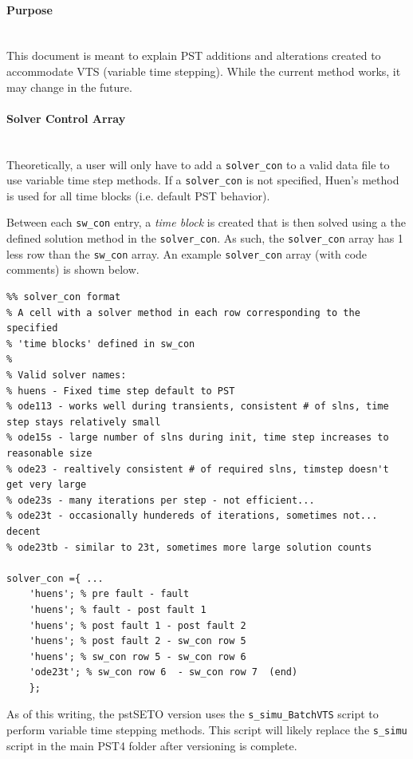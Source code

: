 \documentclass[12pt]{article}
\begin{document}
\onehalfspacing
\paragraph{Purpose} \ \\
This document is meant to explain PST additions and alterations created to accommodate VTS (variable time stepping).
While the current method works, it may change in the future.

\paragraph{Solver Control Array} \ \\
Theoretically, a user will only have to add a \verb|solver_con| to a valid data file to use variable time step methods.
If a \verb|solver_con| is not specified, Huen's method is used for all time blocks (i.e. default PST behavior).

Between each \verb|sw_con| entry, a \emph{time block} is created that is then solved using a the defined solution method in the \verb|solver_con|.
As such, the \verb|solver_con| array has 1 less row than the \verb|sw_con| array.
An example \verb|solver_con| array (with code comments) is shown below.
\begin{verbatim}
%% solver_con format
% A cell with a solver method in each row corresponding to the specified
% 'time blocks' defined in sw_con
%
% Valid solver names:
% huens - Fixed time step default to PST
% ode113 - works well during transients, consistent # of slns, time step stays relatively small
% ode15s - large number of slns during init, time step increases to reasonable size
% ode23 - realtively consistent # of required slns, timstep doesn't get very large
% ode23s - many iterations per step - not efficient...
% ode23t - occasionally hundereds of iterations, sometimes not... decent
% ode23tb - similar to 23t, sometimes more large solution counts

solver_con ={ ...
    'huens'; % pre fault - fault
    'huens'; % fault - post fault 1
    'huens'; % post fault 1 - post fault 2
    'huens'; % post fault 2 - sw_con row 5
    'huens'; % sw_con row 5 - sw_con row 6 
    'ode23t'; % sw_con row 6  - sw_con row 7  (end)
    };
\end{verbatim}

As of this writing, the pstSETO version uses the \verb|s_simu_BatchVTS| script to perform variable time stepping methods.
This script will likely replace the \verb|s_simu| script in the main PST4 folder after versioning is complete.\\
\end{document}
